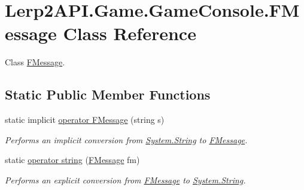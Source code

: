 \hypertarget{class_lerp2_a_p_i_1_1_game_1_1_game_console_1_1_f_message}{}\section{Lerp2\+A\+P\+I.\+Game.\+Game\+Console.\+F\+Message Class Reference}
\label{class_lerp2_a_p_i_1_1_game_1_1_game_console_1_1_f_message}


Class \hyperlink{class_lerp2_a_p_i_1_1_game_1_1_game_console_1_1_f_message}{F\+Message}.  


\subsection*{Static Public Member Functions}
\begin{DoxyCompactItemize}
\item 
static implicit \hyperlink{class_lerp2_a_p_i_1_1_game_1_1_game_console_1_1_f_message_ae81eca15974b18adbb7938d76b35a834}{operator F\+Message} (string s)
\begin{DoxyCompactList}\small\item\em Performs an implicit conversion from \hyperlink{namespace_lerp2_a_p_i_1_1_game_a2f182da062f210cc43f341f6992ee293a27118326006d3829667a400ad23d5d98}{System.\+String} to \hyperlink{class_lerp2_a_p_i_1_1_game_1_1_game_console_1_1_f_message}{F\+Message}. \end{DoxyCompactList}\item 
static \hyperlink{class_lerp2_a_p_i_1_1_game_1_1_game_console_1_1_f_message_a984ac8aadb19232b53a887aa89a0dbef}{operator string} (\hyperlink{class_lerp2_a_p_i_1_1_game_1_1_game_console_1_1_f_message}{F\+Message} fm)
\begin{DoxyCompactList}\small\item\em Performs an explicit conversion from \hyperlink{class_lerp2_a_p_i_1_1_game_1_1_game_console_1_1_f_message}{F\+Message} to \hyperlink{namespace_lerp2_a_p_i_1_1_game_a2f182da062f210cc43f341f6992ee293a27118326006d3829667a400ad23d5d98}{System.\+String}. \end{DoxyCompactList}\end{DoxyCompactItemize}
